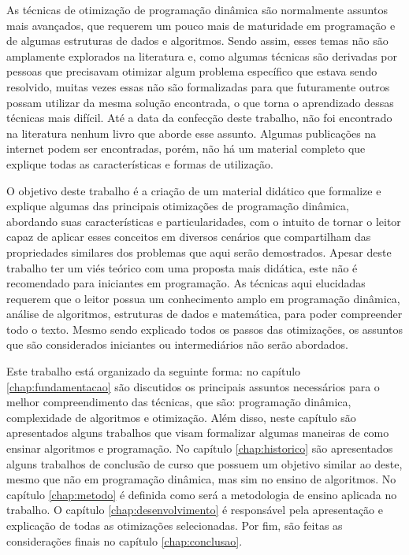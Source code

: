 As técnicas de otimização de programação dinâmica são normalmente assuntos mais avançados, que requerem um pouco mais de maturidade em programação e de algumas estruturas de dados e algoritmos. Sendo assim, esses temas não são amplamente explorados na literatura e, como algumas técnicas são derivadas por pessoas que precisavam otimizar algum problema específico que estava sendo resolvido, muitas vezes essas não são formalizadas para que futuramente outros possam utilizar da mesma solução encontrada, o que torna o aprendizado dessas técnicas mais difícil. Até a data da confecção deste trabalho, não foi encontrado na literatura nenhum livro que aborde esse assunto. Algumas publicações na internet podem ser encontradas, porém, não há um material completo que explique todas as características e formas de utilização.

O objetivo deste trabalho é a criação de um material didático que formalize e explique algumas das principais otimizações de programação dinâmica, abordando suas características e particularidades, com o intuito de tornar o leitor capaz de aplicar esses conceitos em diversos cenários que compartilham das propriedades similares dos problemas que aqui serão demostrados. Apesar deste trabalho ter um viés teórico com uma proposta mais didática, este não é recomendado para iniciantes em programação. As técnicas aqui elucidadas requerem que o leitor possua um conhecimento amplo em programação dinâmica, análise de algoritmos, estruturas de dados e matemática, para poder compreender todo o texto. Mesmo sendo explicado todos os passos das otimizações, os assuntos que são considerados iniciantes ou intermediários não serão abordados.

Este trabalho está organizado da seguinte forma: no capítulo \ref{chap:fundamentacao} são discutidos os principais assuntos necessários para o melhor compreendimento das técnicas, que são: programação dinâmica, complexidade de algoritmos e otimização. Além disso, neste capítulo são apresentados alguns trabalhos que visam formalizar algumas maneiras de como ensinar algoritmos e programação. No capítulo \ref{chap:historico} são apresentados alguns trabalhos de conclusão de curso que possuem um objetivo similar ao deste, mesmo que não em programação dinâmica, mas sim no ensino de algoritmos. No capítulo \ref{chap:metodo} é definida como será a metodologia de ensino aplicada no trabalho. O capítulo \ref{chap:desenvolvimento} é responsável pela apresentação e explicação de todas as otimizações selecionadas. Por fim, são feitas as considerações finais no capítulo \ref{chap:conclusao}.

